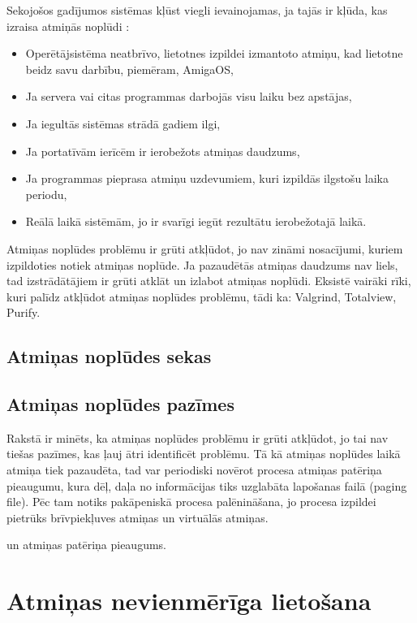 Sekojošos gadījumos sistēmas kļūst viegli ievainojamas, ja tajās ir kļūda, kas izraisa atmiņās noplūdi \cite{RTTV}: 
\begin{itemize}
\item { Operētājsistēma neatbrīvo, lietotnes izpildei izmantoto atmiņu, kad lietotne beidz savu darbību, piemēram, AmigaOS,}
\item { Ja servera vai citas programmas darbojās visu laiku bez apstājas, }
\item { Ja iegultās sistēmas strādā gadiem ilgi, }
\item { Ja portatīvām ierīcēm ir ierobežots atmiņas daudzums, }
\item { Ja programmas pieprasa atmiņu uzdevumiem, kuri izpildās ilgstošu laika periodu, }
\item { Reālā laikā sistēmām, jo ir svarīgi iegūt rezultātu ierobežotajā laikā. }
\end{itemize}

Atmiņas noplūdes problēmu ir grūti atkļūdot,  jo nav zināmi nosacījumi, kuriem izpildoties notiek atmiņas noplūde. 
Ja pazaudētās atmiņas daudzums nav liels, tad izstrādātājiem ir grūti atklāt un izlabot atmiņas noplūdi. 
Eksistē vairāki rīki, kuri palīdz atkļūdot atmiņas noplūdes problēmu, tādi ka: Valgrind, Totalview, Purify.
\subsection{Atmiņas noplūdes sekas}





\subsection{Atmiņas noplūdes pazīmes}

Rakstā \cite{RHBJ} ir minēts, ka atmiņas noplūdes problēmu ir grūti atkļūdot, jo tai nav tiešas pazīmes, kas ļauj ātri identificēt problēmu.
Tā kā atmiņas noplūdes laikā atmiņa tiek pazaudēta, tad var periodiski novērot procesa atmiņas patēriņa pieaugumu, kura dēļ, daļa no informācijas tiks uzglabāta lapošanas failā (paging file).
Pēc tam notiks pakāpeniskā procesa palēnināšana, jo procesa izpildei pietrūks brīvpiekļuves atmiņas un virtuālās atmiņas.

 un atmiņas patēriņa pieaugums. 




\section{Atmiņas nevienmērīga lietošana}
